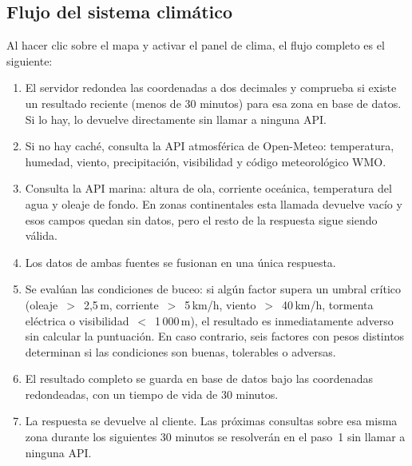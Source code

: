 \subsection*{Flujo del sistema climático}

Al hacer clic sobre el mapa y activar el panel de clima, el flujo completo es el siguiente:

\begin{enumerate}
    \item El servidor redondea las coordenadas a dos decimales y comprueba si existe un resultado reciente (menos de 30 minutos) para esa zona en base de datos. Si lo hay, lo devuelve directamente sin llamar a ninguna API.
    \item Si no hay caché, consulta la API atmosférica de Open-Meteo: temperatura, humedad, viento, precipitación, visibilidad y código meteorológico WMO.
    \item Consulta la API marina: altura de ola, corriente oceánica, temperatura del agua y oleaje de fondo. En zonas continentales esta llamada devuelve vacío y esos campos quedan sin datos, pero el resto de la respuesta sigue siendo válida.
    \item Los datos de ambas fuentes se fusionan en una única respuesta.
    \item Se evalúan las condiciones de buceo: si algún factor supera un umbral crítico (oleaje~$>$~2{,}5\,m, corriente~$>$~5\,km/h, viento~$>$~40\,km/h, tormenta eléctrica o visibilidad~$<$~1\,000\,m), el resultado es inmediatamente adverso sin calcular la puntuación. En caso contrario, seis factores con pesos distintos determinan si las condiciones son buenas, tolerables o adversas.
    \item El resultado completo se guarda en base de datos bajo las coordenadas redondeadas, con un tiempo de vida de 30 minutos.
    \item La respuesta se devuelve al cliente. Las próximas consultas sobre esa misma zona durante los siguientes 30 minutos se resolverán en el paso~1 sin llamar a ninguna API.
\end{enumerate}

